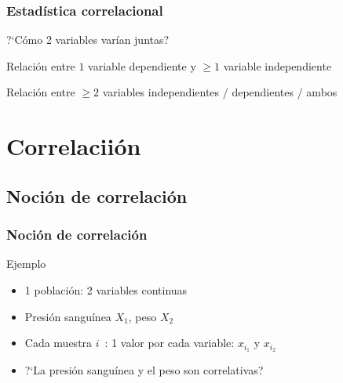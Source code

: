 \documentclass[gray,handout,mathserif]{beamer}
\begin{document}
\begin{frame}[label=corroverv2]
   \frametitle{Estad\'istica correlacional}
   \begin{description}[---------------------------]
       \item[Correlaci\'on:] ?`C\'omo 2 variables var\'ian juntas?
       \item[Regresi\'on:] Relaci\'on entre $1$ variable dependiente y $\geq 1$ variable independiente
       \item[An\'alisis multivariados:] Relaci\'on entre $\geq 2$ variables independientes / dependientes / ambos 
   \end{description}
\end{frame}%



\section{Correlacii\'on}
 
\subsection[Noci\'on de correlaci\'on]{Noci\'on de correlaci\'on}

\begin{frame}[label=introcorr1]
   \frametitle{Noci\'on de correlaci\'on}
    \begin{exampleblock}{Ejemplo}
       \begin{itemize}
          \item 1 poblaci\'on: 2 variables continuas 
          \item Presi\'on sangu\'inea $X_1$, peso $X_2$
          \item Cada muestra $i$~: 1 valor por cada variable: $x_{i_1}$ y $x_{i_2}$
       \end{itemize}
    \end{exampleblock}
    \begin{itemize}[<+-| handout:1>]
      \item ?`La presi\'on sangu\'inea y el peso son correlativas?
   \end{itemize}
\end{frame}%
\end{document}
